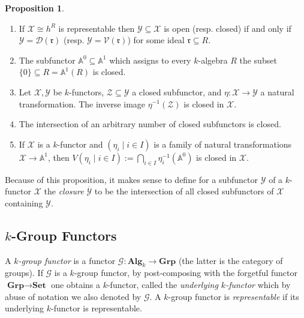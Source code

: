 \documentclass[oneside,11pt]{amsart}
\newcommand{\aaa}{\ensuremath{\mathbb{A}}}
\newcommand{\bSet}{\ensuremath{\textbf{Set}}}
\newcommand{\bAlg}{\ensuremath{\textbf{Alg}}}
\newcommand{\bGrp}{\ensuremath{\textbf{Grp}}}
\newcommand{\mX}{\ensuremath{\mathcal{X}}}
\newcommand{\mY}{\ensuremath{\mathcal{Y}}}
\newcommand{\mZ}{\ensuremath{\mathcal{Z}}}
\newcommand{\mG}{\ensuremath{\mathcal{G}}}
\newcommand{\mD}{\ensuremath{\mathcal{D}}}
\newcommand{\mV}{\ensuremath{\mathcal{V}}}
\newcommand{\fr}{\ensuremath{\mathfrak{r}}}
\theoremstyle{definition}
\newtheorem{proof techniques}{Proof Techniques}
\newtheorem{proposition}{Proposition}
\begin{document}
\begin{proposition}\label{prop: properties of closed subfunctors}
\

\begin{enumerate}

\item If $\mX \cong h^R$ is representable then $\mY \subseteq \mX$ is open (resp. closed) if and only if $\mY = \mD(\fr)$ (resp. $\mY = \mV(\fr)$) for some ideal $\fr \subseteq R$. 

\item The subfunctor $\aaa^0 \subseteq \aaa^1$ which assigns to every $k$-algebra $R$ the subset $\{ 0 \} \subseteq R = \aaa^1(R)$ is closed. 

\item Let $\mX, \mY$ be $k$-functors, $\mZ \subseteq \mY$ a closed subfunctor, and $\eta : \mX \to \mY$ a natural transformation. The inverse image $\eta^{-1}(\mZ)$ is closed in $\mX$. 

\item The intersection of an arbitrary number of closed subfunctors is closed. 

\item If $\mX$ is a $k$-functor and $(\eta_i \mid i \in I)$ is a family of natural transformations $\mX \to \aaa^1$, then $V( \eta_i \mid i \in I ) := \bigcap_{i \in I} \eta_i^{-1}(\aaa^0)$ is closed in $\mX$. 

\end{enumerate}
\end{proposition}



Because of this proposition, it makes sense to define for a subfunctor $\mY$ of a $k$-functor $\mX$ the \emph{closure} $\overline{\mY}$ to be the intersection of all closed subfunctors of $\mX$ containing $\mY$. 


\subsection{$k$-Group Functors}

A \emph{$k$-group functor} is a functor $\mG : \bAlg_k \to \bGrp$ (the latter is the category of groups). If $\mG$ is a $k$-group functor, by post-composing with the forgetful functor $\bGrp \to \bSet$ one obtains a $k$-functor, called the \emph{underlying $k$-functor} which by abuse of notation we also denoted by $\mG$. A $k$-group functor is \emph{representable} if its underlying $k$-functor is representable.  
\end{document}
